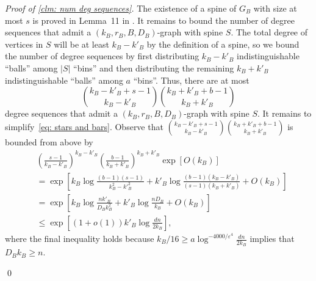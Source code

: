 \documentclass[11pt]{article}
\newcommand{\eps}{\varepsilon}
\theoremstyle{plain}
\begin{document}
\noindent\textit{Proof of \cref{clm: num deg sequences}.}
The existence of a spine of $G_B$ with size at most $s$ is proved in Lemma~11 in \cite{osthus2003densities}. It remains to bound the number of degree sequences that admit a $(k_B, r_B, B, D_B)$-graph with spine $S$. The total degree of vertices in $S$ will be at least $k_B - k'_B$ by the definition of a spine, so we bound the number of degree sequences by first distributing $k_B - k'_B$ indistinguishable ``balls'' among $|S|$ ``bins'' and then distributing the remaining $k_B + k'_B$ indistinguishable ``balls'' among $a$ ``bins''. Thus, there are at most 
\begin{equation}\label{eq: stars and bars}
    \binom{k_B-k'_B + s - 1}{k_B-k'_B}\binom{k_B + k'_B + b - 1}{k_B + k'_B}
\end{equation}
degree sequences that admit a $(k_B, r_B, B, D_B)$-graph with spine $S$. It remains to simplify~\eqref{eq: stars and bars}. Observe that $ \binom{k_B-k'_B + s - 1}{k_B-k'_B}\binom{k_B + k'_B + b - 1}{k_B + k'_B}$ is bounded from above by 
\begin{align*}
    &\left(\frac{s-1}{k_B-k'_B}\right)^{k_B - k'_B}\left(\frac{b-1}{k_B + k'_B}\right)^{k_B + k'_B}\exp[O(k_B)]\\
    &= \exp\left[k_B\log\frac{(b-1)(s-1)}{k^2_B - k'^2_B} +k'_B\log\frac{(b-1)(k_B - k'_B)}{(s-1)(k_B + k'_B)} + O(k_B)\right]\\
    &= \exp\left[k_B\log\frac{nk'_B}{D_Bk_B^2} + k'_B\log\frac{nD_B}{k_B} + O(k_B)\right]\\
    &\leq \exp\left[(1 + o(1))k'_B\log\frac{dn}{2k_B}\right],
\end{align*}
where the final inequality holds because $k_B/16 \geq a\log^{-4000/\eps^{4}}\frac{dn}{2k_B}$ implies that $D_Bk_B \geq n$.


\qed
\end{document}
